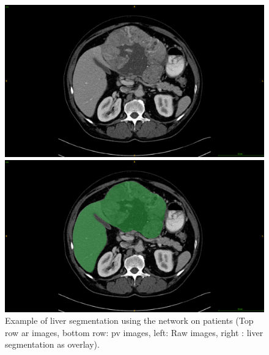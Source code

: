 \begin{figure}[ht!]
\vspace{0.8cm}
\begin{minipage}{0.45\linewidth}
\includegraphics[width=0.9\linewidth]{../HistologicalGradePrediction/images/TCIA_CECTLiver_prediction_TCGA-DD-A11A_slice42_raw}
\end{minipage}
\hspace{0.3cm}
\begin{minipage}{0.45\linewidth}
\includegraphics[width=0.9\linewidth]{../HistologicalGradePrediction/images/TCIA_CECTLiver_prediction_TCGA-DD-A11A_slice42_greenLiver}
\end{minipage}
\caption{Example of liver segmentation using the  network on \textbf{}
patients (Top row \ac{ar} images, bottom row: \ac{pv} images, left:
Raw images, right : liver segmentation as overlay).}
\label{fig:LiverPredTciaDb}
\end{figure}

